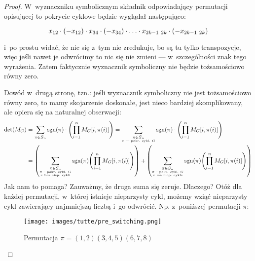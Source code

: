 \begin{proof}
        W~wyznaczniku symbolicznym składnik odpowiadający permutacji opisującej to pokrycie cyklowe będzie wyglądał następująco:
        
        \begin{equation*}
            x_{12} \cdot \left(-x_{12}\right) \cdot x_{34} \cdot \left(-x_{34}\right) \cdot \ldots \cdot x_{2k - 1\ 2k} \cdot \left(-x_{2k - 1\ 2k}\right)
        \end{equation*}
        
        i~po prostu widać, że nic się z~tym nie zredukuje, bo są tu tylko transpozycje, więc jeśli nawet je odwrócimy to nic się nie zmieni --- w~szczególności znak tego wyrażenia. Zatem faktycznie wyznacznik symboliczny nie będzie tożsamościowo równy zero.
        
        Dowód w~drugą stronę, tzn.: jeśli wyznacznik symboliczny nie jest tożsamościowo równy zero, to mamy skojarzenie  doskonałe, jest nieco bardziej skomplikowany, ale opiera się na naturalnej obserwacji:
        \begin{equation*}
            \begin{split}
                \det\pars{M_G}
                    &= \sum_{\pi \in S_n}\sgn\pars{\pi} \cdot \pars{\prod_{i = 1}^{n}M_G[i, \pi\pars{i}]}
                    = \sum_{\substack{\pi \in S_n\\\text{\tiny $\pi$ --- pokr. cykl. $G$}}}\sgn\pars{\pi} \cdot \pars{\prod_{i = 1}^{n}M_G[i, \pi\pars{i}]}\\
                    &= \pars{\sum_{\substack{\pi \in S_n\\\text{\tiny $\pi$ -- pokr. cykl. $G$}\\\text{\tiny $\pi$ bez niep. cykli}}}\sgn\pars{\pi}\pars{\prod_{i = 1}^{n}M_G[i, \pi\pars{i}]}} + \pars{\sum_{\substack{\pi \in S_n\\\text{\tiny $\pi$ -- pokr. cykl. $G$}\\\text{\tiny $\pi$ ma niep. cykle}}}\sgn\pars{\pi}\pars{\prod_{i = 1}^{n}M_G[i, \pi\pars{i}]}}
            \end{split}
        \end{equation*}
        Jak nam to pomaga? Zauważmy, że druga suma się zeruje. Dlaczego? Otóż dla każdej permutacji, w~której istnieje nieparzysty cykl, możemy wziąć nieparzysty cykl zawierający najmniejszą liczbą i~go odwrócić. Np. z~poniższej permutacji $\pi$:
        
        \begin{figure}[H]
            \centering
            \texttt{[image: images/tutte/pre\_switching.png]}
            \caption{Permutacja $\pi = (1, 2)(3, 4, 5)(6, 7, 8)$}
        \end{figure}
        

\end{proof}
